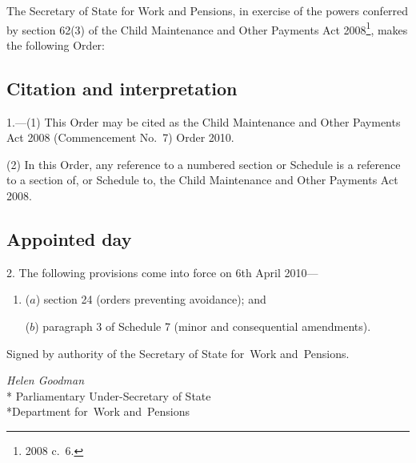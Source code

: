 \documentclass[12pt,a4paper]{article}
\title{\regstitle}
\author{S.I.\ 2010 No.\ 697 (C.~44)}
\date{Made
8th March 2010
}
\begin{document}
\maketitle

\noindent
The Secretary of State for Work and Pensions, in exercise of the powers conferred by section 62(3) of the Child Maintenance and Other Payments Act 2008\footnote{2008 c.~6.}, makes the following Order: 

{\sloppy

\tableofcontents

}

\bigskip

\setcounter{secnumdepth}{-2}

\subsection[1. Citation and interpretation]{Citation and interpretation}

1.---(1)  This Order may be cited as the Child Maintenance and Other Payments Act 2008 (Commencement No.~7) Order 2010.

(2) In this Order, any reference to a numbered section or Schedule is a reference to a section of, or Schedule to, the Child Maintenance and Other Payments Act 2008.

\subsection[2. Appointed day]{Appointed day}

2.  The following provisions come into force on 6th April 2010—
\begin{enumerate}\item[]
($a$) section 24 (orders preventing avoidance); and

($b$) paragraph 3 of Schedule 7 (minor and consequential amendments).
\end{enumerate}

\bigskip

\pagebreak[3]

Signed 
by authority of the 
Secretary of State for~Work and~Pensions.

{\raggedleft
\emph{Helen Goodman}\\*
Parliamentary Under-Secretary 
of State\\*Department 
for~Work and~Pensions

}
\end{document}
